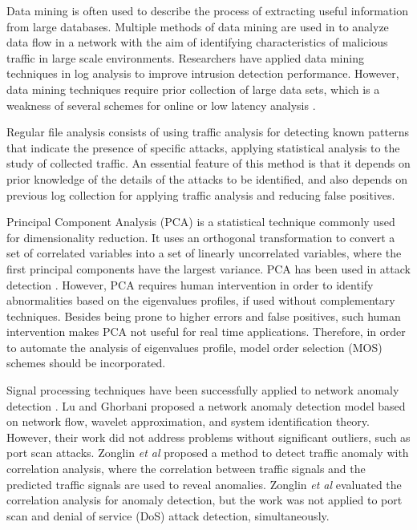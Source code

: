 \documentclass{bmcart}
\begin{document}
Data mining is often used to describe the process of extracting useful information from large databases. Multiple methods of data mining are used in \cite{he2008applying} to analyze data flow in a network with the aim of identifying characteristics of malicious traffic in large scale environments. Researchers have applied data mining techniques in log analysis \cite{ghourabi2010data} to improve intrusion detection performance. However, data mining techniques require prior collection of large data sets, which is a weakness of several schemes for online or low latency analysis \cite{Huang2009}.

Regular file analysis \cite{raynal2004honeypot} consists of using traffic analysis for detecting known patterns that indicate the presence of specific attacks, applying statistical analysis to the study of collected traffic. An essential feature of this method is that it depends on prior knowledge of the details of the attacks to be identified, and also depends on previous log collection for applying traffic analysis and reducing false positives.

Principal Component Analysis (PCA) is a statistical technique commonly used for dimensionality reduction. It uses an orthogonal transformation to convert a set of correlated variables into a set of linearly uncorrelated variables, where the first principal components have the largest variance. PCA has been used in attack detection \cite{almotairi2009technique}. However, PCA requires human intervention in order to identify abnormalities based on the eigenvalues profiles, if used without complementary techniques. Besides being prone to higher errors and false positives, such human intervention makes PCA not useful for real time applications. Therefore, in order to automate the analysis of eigenvalues profile, model order selection (MOS) schemes should be incorporated.

Signal processing techniques have been successfully applied to network anomaly detection \cite{Lu2009}. Lu and Ghorbani \cite{Lu2009} proposed a network anomaly detection model based on network flow, wavelet approximation, and system identification theory. However, their work did not address problems without significant outliers, such as port scan attacks. Zonglin \emph{et al} \cite{Zonglin2009} proposed a method to detect traffic anomaly with correlation analysis, where the correlation between traffic signals and the predicted traffic signals are used to reveal anomalies. Zonglin \emph{et al} \cite{Zonglin2009} evaluated the correlation analysis for anomaly detection, but the work was not applied to port scan and denial of service (DoS) attack detection, simultaneously. 
\end{document}

